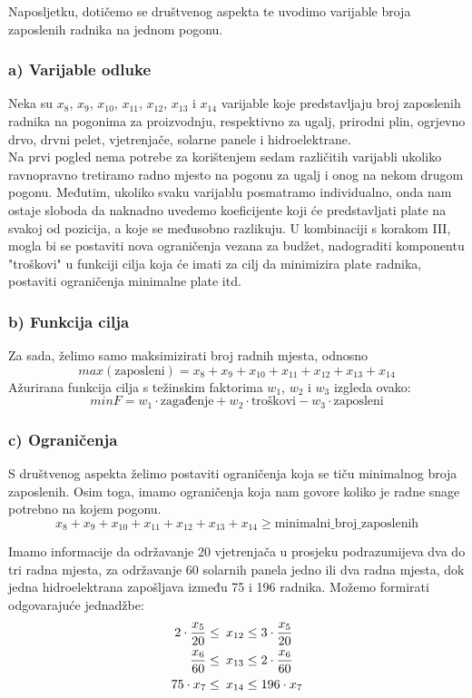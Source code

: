\documentclass[12pt, a4paper]{paper}
\begin{document}
Naposljetku, dotičemo se društvenog aspekta te uvodimo varijable broja zaposlenih radnika na jednom pogonu.

\subsubsection*{a) Varijable odluke}

Neka su $x_{8}$, $x_{9}$, $x_{10}$, $x_{11}$, $x_{12}$, $x_{13}$ i $x_{14}$ varijable koje predstavljaju broj zaposlenih radnika na pogonima za proizvodnju, respektivno za ugalj, prirodni plin, ogrjevno drvo, drvni pelet, vjetrenjače, solarne panele i hidroelektrane.\\

Na prvi pogled nema potrebe za korištenjem sedam različitih varijabli ukoliko ravnopravno tretiramo radno mjesto na pogonu za ugalj i onog na nekom drugom pogonu. Međutim, ukoliko svaku varijablu posmatramo individualno, onda nam ostaje sloboda da naknadno uvedemo koeficijente koji će predstavljati plate na svakoj od pozicija, a koje se međusobno razlikuju. U kombinaciji s korakom III, mogla bi se postaviti nova ograničenja vezana za budžet, nadograditi komponentu "troškovi" u funkciji cilja koja će imati za cilj da minimizira plate radnika, postaviti ograničenja minimalne plate itd.

\subsubsection*{b) Funkcija cilja}

Za sada, želimo samo maksimizirati broj radnih mjesta, odnosno \[max(\text{zaposleni}) = x_{8} + x_{9} + x_{10} + x_{11} + x_{12} + x_{13} + x_{14}\]
Ažurirana funkcija cilja s težinskim faktorima $w_1$, $w_2$ i $w_3$ izgleda ovako:
\[min F = w_1 \cdot \text{zagađenje} + w_2 \cdot \text{troškovi} - w_3 \cdot \text{zaposleni}\]

\subsubsection*{c) Ograničenja}

S društvenog aspekta želimo postaviti ograničenja koja se tiču minimalnog broja zaposlenih. Osim toga, imamo ograničenja koja nam govore koliko je radne snage potrebno na kojem pogonu.
\[ x_{8} + x_{9} + x_{10} + x_{11} + x_{12} + x_{13} + x_{14} \geq \text{minimalni\_broj\_zaposlenih} \]

Imamo informacije da održavanje 20 vjetrenjača u prosjeku podrazumijeva dva do tri radna mjesta, za održavanje 60 solarnih panela jedno ili dva radna mjesta, dok jedna hidroelektrana zapošljava između 75 i 196 radnika. Možemo formirati odgovarajuće jednadžbe:
\begin{align*}
	2 \cdot \frac{x_5}{20} \leq\enspace&x_{12}\space\leq 3 \cdot \frac{x_5}{20}\\
	\frac{x_6}{60} \leq\enspace&x_{13}\space\leq 2\cdot \frac{x_6}{60}\\
	75 \cdot x_7 \leq\enspace&x_{14}\space\leq 196 \cdot x_7
\end{align*}
\end{document}

